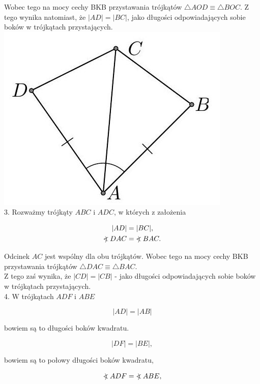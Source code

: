 \documentclass[10pt]{article}
\newcommand\Varangle{\mathop{{<\!\!\!\!\!\text{\small)}}\:}\nolimits}
\begin{document}
Wobec tego na mocy cechy BKB przystawania trójkątów \(\triangle A O D \equiv \triangle B O C\). Z tego wynika natomiast, że \(|A D|=|B C|\), jako długości odpowiadających sobie boków w trójkątach przystających.\\
\includegraphics[max width=\textwidth, center]{2024_11_21_71f62bd117d375398909g-058(1)}\\
3. Rozważmy trójkąty \(A B C\) i \(A D C\), w których z założenia

\[
\begin{aligned}
|A D| & =|B C|, \\
\Varangle D A C & =\Varangle B A C .
\end{aligned}
\]

Odcinek \(A C\) jest wspólny dla obu trójkątów. Wobec tego na mocy cechy BKB przystawania trójkątów \(\triangle D A C \equiv \triangle B A C\).\\
Z tego zaś wynika, że \(|C D|=|C B|\) - jako długości odpowiadających sobie boków w trójkątach przystających.\\
4. W trójkątach \(A D F\) i \(A B E\)

\[
|A D|=|A B|
\]

bowiem są to długości boków kwadratu.

\[
|D F|=|B E|,
\]

bowiem są to połowy długości boków kwadratu,

\[
\Varangle A D F=\Varangle A B E,
\]
\end{document}
